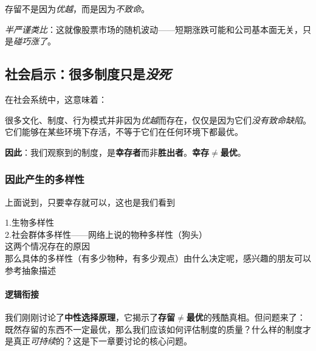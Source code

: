 \documentclass[../main.tex]{subfiles}
\begin{document}
	存留不是因为\textit{优越}，而是因为\textit{不致命}。

	\textit{半严谨类比}：这就像股票市场的随机波动——短期涨跌可能和公司基本面无关，只是\textit{碰巧涨了}。

	\subsection{社会启示：很多制度只是\textit{没死}}

	在社会系统中，这意味着：

	很多文化、制度、行为模式并非因为\textit{优越}而存在，仅仅是因为它们\textit{没有致命缺陷}。它们能够在某些环境下存活，不等于它们在任何环境下都最优。

	\textbf{\Large 因此}：我们观察到的制度，是\textbf{幸存者}而非\textbf{胜出者}。\textbf{幸存$\neq$最优}。
	
	\subsubsection{因此产生的多样性}

上面说到，只要幸存就可以，这也是我们看到

1.生物多样性
\\
2.社会群体多样性——网络上说的物种多样性（狗头）
\\
这两个情况存在的原因
\\
那么具体的多样性（有多少物种，有多少观点）由什么决定呢，感兴趣的朋友可以参考抽象描述
\label{main:various}



	\paragraph*{逻辑衔接}
	我们刚刚讨论了\textbf{中性选择原理}，它揭示了\textbf{存留$\neq$最优}的残酷真相。但问题来了：既然存留的东西不一定最优，那么我们应该如何评估制度的质量？什么样的制度才是真正\textit{可持续}的？这是下一章要讨论的核心问题。
\end{document}
